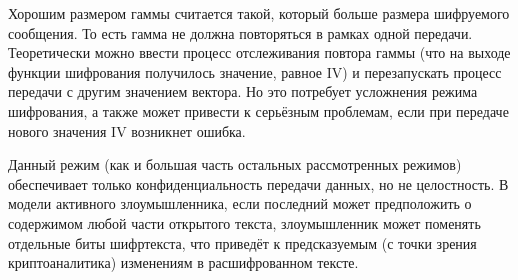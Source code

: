 Хорошим размером гаммы считается такой, который больше размера шифруемого сообщения. То есть гамма не должна повторяться в рамках одной передачи. Теоретически можно ввести процесс отслеживания повтора гаммы (что на выходе функции шифрования получилось значение, равное $\textrm{IV}$) и перезапускать процесс передачи с другим значением вектора. Но это потребует усложнения режима шифрования, а также может привести к серьёзным проблемам, если при передаче нового значения $\textrm{IV}$ возникнет ошибка.

Данный режим (как и большая часть остальных рассмотренных режимов) обеспечивает только конфиденциальность передачи данных, но не целостность. В модели активного злоумышленника, если последний может предположить о содержимом любой части открытого текста, злоумышленник может поменять отдельные биты шифртекста, что приведёт к предсказуемым (с точки зрения криптоаналитика) изменениям в расшифрованном тексте.